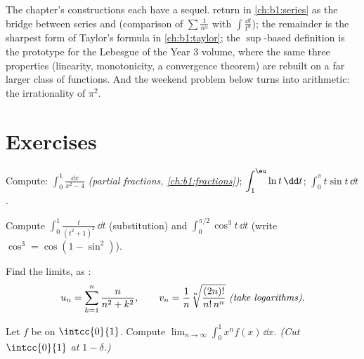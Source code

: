 \begin{remark}
The chapter's constructions each have a sequel. 
return in \cref{ch:b1:series} as the bridge between series and
 (comparison of $\sum \frac{1}{n^\alpha}$ with $\int
\frac{\dd t}{t^\alpha}$); the  remainder is the sharpest
form of Taylor's formula in \cref{ch:b1:taylor}; the
$\sup$-based definition is the prototype for the Lebesgue
 of the Year 3 volume, where the same three properties
(linearity, monotonicity, a convergence theorem) are rebuilt on a
far larger class of functions. And the weekend problem below
turns  into arithmetic: the irrationality of
$\pi^2$.
\end{remark}

\section{Exercises}

\begin{exercise}[$\star$]\label{exo:b1:integration:1}
Compute: $\displaystyle\int_0^1 \frac{\dd x}{x^2 - 4}$
\emph{(partial fractions, \cref{ch:b1:fractions})};
$\displaystyle\int_1^{\eu} \ln t \,\dd t$;
$\displaystyle\int_0^{\pi} t \sin t\, \dd t$.
\end{exercise}

\begin{exercise}[$\star$]\label{exo:b1:integration:2}
Compute $\displaystyle\int_0^{1} \frac{t}{(t^2+1)^2}\,\dd t$
(substitution) and
$\displaystyle\int_0^{\pi/2} \cos^3 t\, \dd t$ (write $\cos^3 =
\cos(1 - \sin^2)$).
\end{exercise}

\begin{exercise}[$\star$]\label{exo:b1:integration:3}
Find the limits, as :
\[
u_n = \sum_{k=1}^{n} \frac{n}{n^2 + k^2},
\qquad
v_n = \frac{1}{n}\sqrt[n]{\frac{(2n)!}{n!\,n^n}}
\ \emph{(take logarithms)}.
\]
\end{exercise}

\begin{exercise}[$\star$]\label{exo:b1:integration:4}
Let $f$ be  on $\intcc{0}{1}$. Compute $\lim_{n\to\infty}
\int_0^1 x^n f(x)\,\dd x$. \emph{(Cut $\intcc{0}{1}$ at $1 -
\delta$.)}
\end{exercise}

